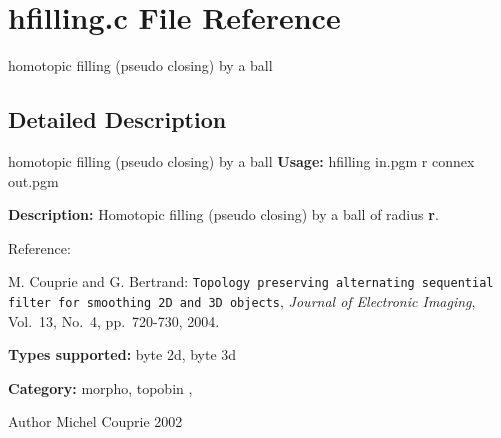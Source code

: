 \section{hfilling.c File Reference}
\label{hfilling_8c}


homotopic filling (pseudo closing) by a ball  




\subsection{Detailed Description}
homotopic filling (pseudo closing) by a ball {\bfseries Usage:} hfilling in.pgm r connex out.pgm

{\bfseries Description:} Homotopic filling (pseudo closing) by a ball of radius {\bfseries r}.

Reference:\par
 [CB04] M. Couprie and G. Bertrand: {\tt Topology preserving alternating sequential filter for smoothing 2D and 3D objects}, {\itshape  Journal of Electronic Imaging\/}, Vol.~13, No.~4, pp.~720-\/730, 2004.

{\bfseries Types supported:} byte 2d, byte 3d

{\bfseries Category:} morpho, topobin ,

\begin{DoxyAuthor}{Author}
Michel Couprie 2002 
\end{DoxyAuthor}
